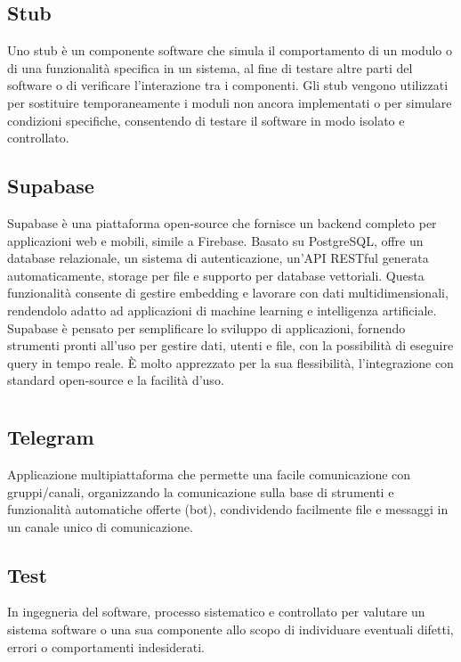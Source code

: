 \hypertarget{sec:stub}{}
\subsection*{Stub}
Uno stub è un componente software che simula il comportamento di un modulo o di una funzionalità specifica in un sistema, al fine di testare altre parti
del software o di verificare l'interazione tra i componenti. Gli stub vengono utilizzati per sostituire temporaneamente i moduli non ancora implementati
o per simulare condizioni specifiche, consentendo di testare il software in modo isolato e controllato.

\hypertarget{sec:supabase}{}
\subsection*{Supabase}
Supabase è una piattaforma open-source che fornisce un backend completo per applicazioni web e mobili, simile a Firebase. Basato su PostgreSQL, offre un 
database relazionale, un sistema di autenticazione, un'API RESTful generata automaticamente, storage per file e supporto per database vettoriali. Questa 
funzionalità consente di gestire embedding e lavorare con dati multidimensionali, rendendolo adatto ad applicazioni di machine learning e intelligenza 
artificiale. Supabase è pensato per semplificare lo sviluppo di applicazioni, fornendo strumenti pronti all'uso per gestire dati, utenti e file, con la 
possibilità di eseguire query in tempo reale. È molto apprezzato per la sua flessibilità, l'integrazione con standard open-source e la facilità d'uso.

\newpage



\section{}

\hypertarget{sec:telegram}{}
\subsection*{Telegram}
Applicazione multipiattaforma che permette una facile comunicazione con gruppi/canali, organizzando la comunicazione sulla base di strumenti e 
funzionalità automatiche offerte (bot), condividendo facilmente file e messaggi in un canale unico di comunicazione.

\hypertarget{sec:test}{}
\subsection*{Test}
In ingegneria del software, processo sistematico e controllato per valutare un sistema software o una sua componente allo scopo di individuare eventuali 
difetti, errori o comportamenti indesiderati.

